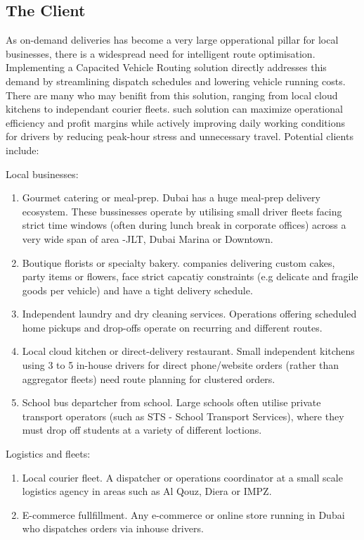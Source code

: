 \documentclass[11pt]{article}
\begin{document}
\subsection{The Client}
As on-demand deliveries has become a very large opperational pillar for local businesses, there is a widespread need for intelligent route optimisation. Implementing a Capacited Vehicle Routing solution directly addresses this demand by streamlining dispatch schedules and lowering vehicle running costs. There are many who may benifit from this solution, ranging from local cloud kitchens to independant courier fleets. such solution can maximize operational efficiency and profit margins while actively improving daily working conditions for drivers by reducing peak-hour stress and unnecessary travel. Potential clients include:

Local businesses:
\begin{enumerate}
  \item Gourmet catering or meal-prep. Dubai has a huge meal-prep delivery ecosystem. These bussinesses operate by utilising small driver fleets facing strict time windows (often during lunch break in corporate offices) across a very wide span of area -JLT, Dubai Marina or Downtown. 
  \item Boutique florists or specialty bakery. companies delivering custom cakes, party items or flowers, face strict capcatiy constraints (e.g delicate and fragile goods per vehicle) and have a tight delivery schedule. 
  \item Independent laundry and dry cleaning services. Operations offering scheduled home pickups and drop-offs operate on recurring and different routes.
  \item Local cloud kitchen or direct-delivery restaurant. Small independent kitchens using 3 to 5 in-house drivers for direct phone/website orders (rather than aggregator fleets) need route planning for clustered orders.
  \item School bus departcher from school. Large schools often utilise private transport operators (such as STS - School Transport Services), where they must drop off students at a variety of different loctions. 
\end{enumerate}

Logistics and fleets:
\begin{enumerate}
  \item Local courier fleet. A dispatcher or operations coordinator at a small scale logistics agency in areas such as Al Qouz, Diera or IMPZ.
  \item E-commerce fullfillment. Any e-commerce or online store running in Dubai who dispatches orders via inhouse drivers.
\end{enumerate}
\end{document}
